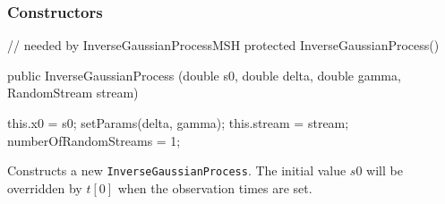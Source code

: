 \subsubsection* {Constructors}
\begin{code}\begin{hide}
    // needed by InverseGaussianProcessMSH
   protected InverseGaussianProcess()  { }
\end{hide}

   public InverseGaussianProcess (double s0, double delta, double gamma,
                                  RandomStream stream) \begin{hide} {
        this.x0 = s0;
        setParams(delta, gamma);
        this.stream = stream;
        numberOfRandomStreams = 1;
    }\end{hide}
\end{code}
\begin{tabb} Constructs a new \texttt{InverseGaussianProcess}.
The initial value $s0$ will be overridden by $t[0]$ when
the observation times are set.
\end{tabb}


